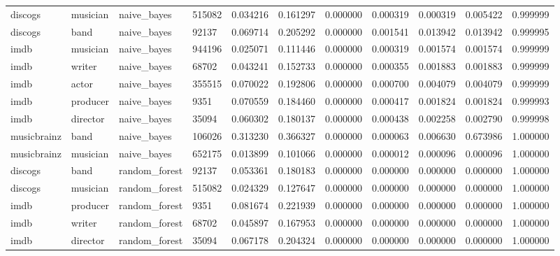 \documentclass[epsfig,a4paper,11pt,titlepage,twoside,openany]{book}
\begin{document}
\begin{longtable}{|l|l|l|l|l|l|l|l|l|l|l|}
discogs     & musician & naive\_bayes                      & 515082 & 0.034216 & 0.161297 & 0.000000 & 0.000319 & 0.000319 & 0.005422 & 0.999999 \\
discogs     & band     & naive\_bayes                      & 92137  & 0.069714 & 0.205292 & 0.000000 & 0.001541 & 0.013942 & 0.013942 & 0.999995 \\
imdb        & musician & naive\_bayes                      & 944196 & 0.025071 & 0.111446 & 0.000000 & 0.000319 & 0.001574 & 0.001574 & 0.999999 \\
imdb        & writer   & naive\_bayes                      & 68702  & 0.043241 & 0.152733 & 0.000000 & 0.000355 & 0.001883 & 0.001883 & 0.999999 \\
imdb        & actor    & naive\_bayes                      & 355515 & 0.070022 & 0.192806 & 0.000000 & 0.000700 & 0.004079 & 0.004079 & 0.999999 \\
imdb        & producer & naive\_bayes                      & 9351   & 0.070559 & 0.184460 & 0.000000 & 0.000417 & 0.001824 & 0.001824 & 0.999993 \\
imdb        & director & naive\_bayes                      & 35094  & 0.060302 & 0.180137 & 0.000000 & 0.000438 & 0.002258 & 0.002790 & 0.999998 \\
musicbrainz & band     & naive\_bayes                      & 106026 & 0.313230 & 0.366327 & 0.000000 & 0.000063 & 0.006630 & 0.673986 & 1.000000 \\
musicbrainz & musician & naive\_bayes                      & 652175 & 0.013899 & 0.101066 & 0.000000 & 0.000012 & 0.000096 & 0.000096 & 1.000000 \\ \hline
discogs     & band     & random\_forest                    & 92137  & 0.053361 & 0.180183 & 0.000000 & 0.000000 & 0.000000 & 0.000000 & 1.000000 \\
discogs     & musician & random\_forest                    & 515082 & 0.024329 & 0.127647 & 0.000000 & 0.000000 & 0.000000 & 0.000000 & 1.000000 \\
imdb        & producer & random\_forest                    & 9351   & 0.081674 & 0.221939 & 0.000000 & 0.000000 & 0.000000 & 0.000000 & 1.000000 \\
imdb        & writer   & random\_forest                    & 68702  & 0.045897 & 0.167953 & 0.000000 & 0.000000 & 0.000000 & 0.000000 & 1.000000 \\
imdb        & director & random\_forest                    & 35094  & 0.067178 & 0.204324 & 0.000000 & 0.000000 & 0.000000 & 0.000000 & 1.000000 \\

\end{longtable}
\end{document}
